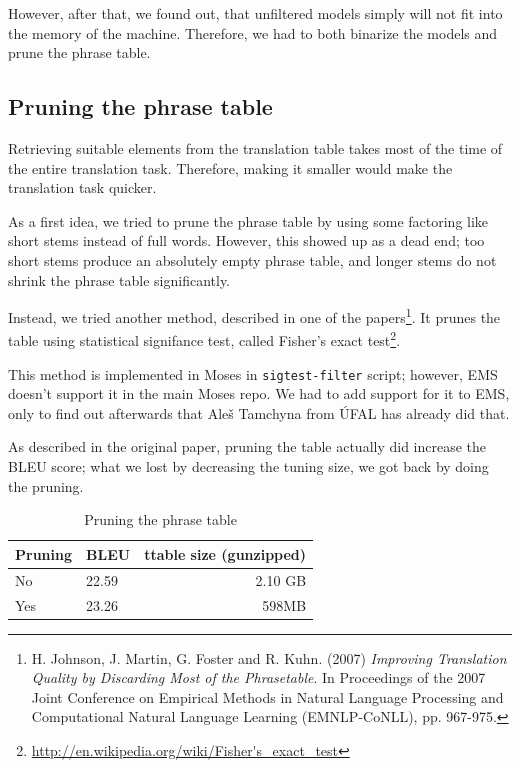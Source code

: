 However, after that, we found out, that unfiltered models simply will not fit into the memory of the machine. Therefore, we had to both binarize the models and prune the phrase table.

\subsection{Pruning the phrase table}
Retrieving suitable elements from the translation table takes most of the time of the entire translation task. Therefore, making it smaller would make the translation task quicker.

As a first idea, we tried to prune the phrase table by using some factoring like short stems instead of full words. However, this showed up as a dead end; too short stems produce an absolutely empty phrase table, and longer stems do not shrink the phrase table significantly.

Instead, we tried another method, described in one of the papers\footnote{H. Johnson, J. Martin, G. Foster and R. Kuhn. (2007) \emph{Improving Translation Quality by Discarding Most of the Phrasetable}. In Proceedings of the 2007 Joint Conference on Empirical Methods in Natural Language Processing and Computational Natural Language Learning (EMNLP-CoNLL), pp. 967-975.}. It prunes the table using statistical signifance test, called Fisher's exact test\footnote{\url{http://en.wikipedia.org/wiki/Fisher's_exact_test}}. 

This method is implemented in Moses in \texttt{sigtest-filter} script; however, EMS doesn't support it in the main Moses repo. We had to add support for it to EMS, only to find out afterwards that Aleš Tamchyna from ÚFAL has already did that.

As described in the original paper, pruning the table actually did increase the BLEU score; what we lost by decreasing the tuning size, we got back by doing the pruning.

\begin{table}[h]
\begin{center}
\begin{tabular}{|l|l|r|}
    \hline
    \textbf{Pruning} & \textbf{BLEU} & \textbf{ttable size (gunzipped)} \\ \hline
    No & 22.59 & 2.10 GB \\ \hline
    Yes & 23.26 & 598MB \\  \hline
\end{tabular}
\end{center}

\caption{Pruning the phrase table}\label{moses:tablepruning}
\end{table}


